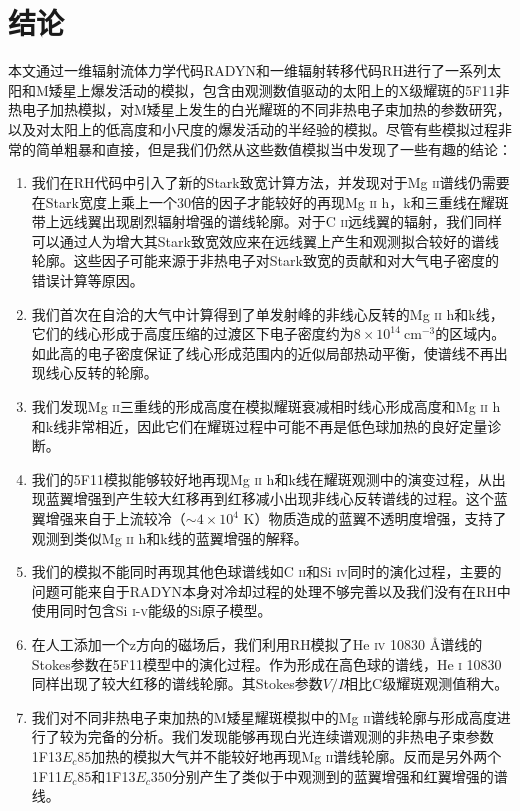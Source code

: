 
\chapter{结论}\label{chap:con}
本文通过一维辐射流体力学代码RADYN和一维辐射转移代码RH进行了一系列太阳和M矮星上爆发活动的模拟，包含由观测数值驱动的太阳上的X级耀斑的5F11非热电子加热模拟，对M矮星上发生的白光耀斑的不同非热电子束加热的参数研究，以及对太阳上的低高度和小尺度的爆发活动的半经验的模拟。尽管有些模拟过程非常的简单粗暴和直接，但是我们仍然从这些数值模拟当中发现了一些有趣的结论：
\begin{enumerate}
	\item 我们在RH代码中引入了新的Stark致宽计算方法，并发现对于Mg \textsc{ii}谱线仍需要在Stark宽度上乘上一个30倍的因子才能较好的再现Mg \textsc{ii} h，k和三重线在耀斑带上远线翼出现剧烈辐射增强的谱线轮廓。对于C \textsc{ii}远线翼的辐射，我们同样可以通过人为增大其Stark致宽效应来在远线翼上产生和观测拟合较好的谱线轮廓。这些因子可能来源于非热电子对Stark致宽的贡献和对大气电子密度的错误计算等原因。
	\item 我们首次在自洽的大气中计算得到了单发射峰的非线心反转的Mg \textsc{ii} h和k线，它们的线心形成于高度压缩的过渡区下电子密度约为$8\times 10^{14}\ \mathrm{cm^{-3}}$的区域内。如此高的电子密度保证了线心形成范围内的近似局部热动平衡，使谱线不再出现线心反转的轮廓。
	\item 我们发现Mg \textsc{ii}三重线的形成高度在模拟耀斑衰减相时线心形成高度和Mg \textsc{ii} h和k线非常相近，因此它们在耀斑过程中可能不再是低色球加热的良好定量诊断。
	\item 我们的5F11模拟能够较好地再现Mg \textsc{ii} h和k线在耀斑观测中的演变过程，从出现蓝翼增强到产生较大红移再到红移减小出现非线心反转谱线的过程。这个蓝翼增强来自于上流较冷（$\sim 4\times10^4$ K）物质造成的蓝翼不透明度增强，支持了\textcites{Tei2018}观测到类似Mg \textsc{ii} h和k线的蓝翼增强的解释。
	\item 我们的模拟不能同时再现其他色球谱线如C \textsc{ii}和Si \textsc{iv}同时的演化过程，主要的问题可能来自于RADYN本身对冷却过程的处理不够完善以及我们没有在RH中使用同时包含Si \textsc{i}-\textsc{v}能级的Si原子模型。
	\item 在人工添加一个z方向的磁场后，我们利用RH模拟了He \textsc{iv} 10830 \mbox{\AA}谱线的Stokes参数在5F11模型中的演化过程。作为形成在高色球的谱线，He \textsc{i} 10830同样出现了较大红移的谱线轮廓。其Stokes参数$V/I$相比C级耀斑观测值稍大。
	\item 我们对不同非热电子束加热的M矮星耀斑模拟中的Mg \textsc{ii}谱线轮廓与形成高度进行了较为完备的分析。我们发现能够再现白光连续谱观测的非热电子束参数1F13$E_c85$加热的模拟大气并不能较好地再现Mg \textsc{ii}谱线轮廓。反而是另外两个1F11$E_c85$和1F13$E_c350$分别产生了类似于\textcites{Hawley2007}中观测到的蓝翼增强和红翼增强的谱线。

\end{enumerate}
